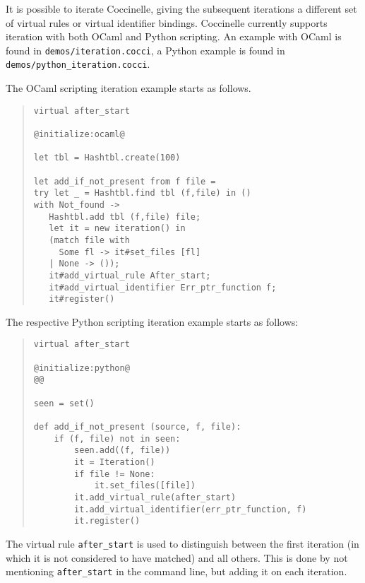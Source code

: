 It is possible to iterate Coccinelle, giving the subsequent iterations a
different set of virtual rules or virtual identifier bindings.  Coccinelle
currently supports iteration with both OCaml and Python scripting. An
example with OCaml is found in {\tt demos/iteration.cocci}, a Python
example is found in {\tt demos/python\_iteration.cocci}.

The OCaml scripting iteration example starts as follows.

\begin{quote}
\begin{verbatim}
virtual after_start

@initialize:ocaml@

let tbl = Hashtbl.create(100)

let add_if_not_present from f file =
try let _ = Hashtbl.find tbl (f,file) in ()
with Not_found ->
   Hashtbl.add tbl (f,file) file;
   let it = new iteration() in
   (match file with
     Some fl -> it#set_files [fl]
   | None -> ());
   it#add_virtual_rule After_start;
   it#add_virtual_identifier Err_ptr_function f;
   it#register()
\end{verbatim}
\end{quote}

The respective Python scripting iteration example starts as follows:

\begin{quote}
\begin{verbatim}
virtual after_start

@initialize:python@
@@

seen = set()

def add_if_not_present (source, f, file):
    if (f, file) not in seen:
        seen.add((f, file))
        it = Iteration()
        if file != None:
            it.set_files([file])
        it.add_virtual_rule(after_start)
        it.add_virtual_identifier(err_ptr_function, f)
        it.register()
\end{verbatim}
\end{quote}

The virtual rule {\tt after\_start} is used to distinguish between the
first iteration (in which it is not considered to have matched) and all
others.  This is done by not mentioning {\tt after\_start} in the command
line, but adding it on each iteration.


